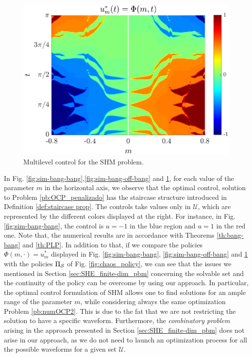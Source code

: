 \documentclass[twocolumn]{autart}    %
\begin{document}
\begin{figure}[ht!]
	\centering
	\includegraphics[scale=0.42]{img/fig08.eps}
	\caption{Multilevel control for the SHM problem.}\label{fig:sim-multi-level}
\end{figure} 

In Fig. \ref{fig:sim-bang-bang},\ref{fig:sim-bang-off-bang} and \ref{fig:sim-multi-level}, for each value of the parameter $m$ in the horizontal axis,  we observe that the optimal control, solution to Problem \ref{pb:OCP_penalizado} has the staircase structure introduced in Definition \ref{def:staircase prop}. The controls take values only in $\mathcal U$, which are represented by the different colors displayed at the right. For instance, in Fig. \ref{fig:sim-bang-bang}, the control is $u=-1$ in the blue region and $u=1$ in the red one. Note that,  the numerical results are in accordance with Theorems \ref{th:bang-bang} and \ref{th:PLP}. In addition to that, if we compare the policies $\Phi (m,\cdot) = u_m^\ast$ displayed in Fig. \ref{fig:sim-bang-bang}, \ref{fig:sim-bang-off-bang} and \ref{fig:sim-multi-level} with the policies $\Pi_{\mathcal{S}}$ of Fig. \ref{fig:chaos_policy}, we can see that the issues we mentioned in Section \ref{sec:SHE_finite-dim_pbm} concerning the solvable set and the continuity of the policy can be overcome by using our approach. In particular,  the optimal control formulation of SHM allows one to find solutions for an ample range of the parameter $m$, while considering always the same optimization Problem \ref{pb:numOCP2}. This is due to the fat that we are not restricting the solution to have a specific waveform. Furthermore, the \textit{combinatory problem} arising in the approach presented in Section \ref{sec:SHE_finite-dim_pbm} does not arise in our approach, as we do not need to launch an optimization process for all the possible waveforms for a given set $\mathcal U$. 
\end{document}
